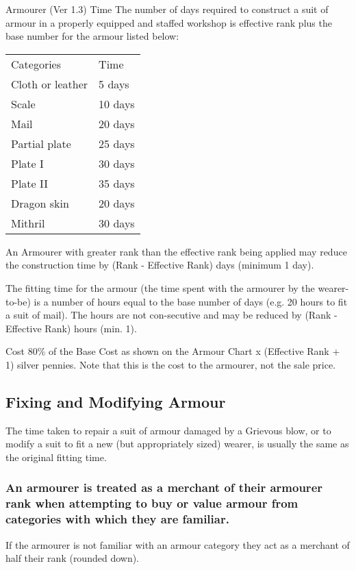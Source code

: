 \begin{Chapter}{Armourer (Ver 1.3)}
Time The number of days required to construct a suit of armour in a
properly equipped and staffed workshop is effective rank plus the base
number for the armour listed below:

\begin{tabularx}{\columnwidth}{ll}
Categories		& Time \\
Cloth or leather	& 5 days \\
Scale			& 10 days \\
Mail			& 20 days \\
Partial plate		& 25 days \\
Plate I			& 30 days \\
Plate II		& 35 days \\
Dragon skin		& 20 days \\
Mithril			& 30 days \\
\end{tabularx}

An Armourer with greater rank than the effective rank being applied
may reduce the construction time by (Rank - Effective Rank) days
(minimum 1 day).

The fitting time for the armour (the time spent with the armourer by
the wearer-to-be) is a number of hours equal to the base number of
days (e.g.  20 hours to fit a suit of mail). The hours are not
con-secutive and may be reduced by (Rank - Effective Rank) hours
(min. 1).

Cost 80\% of the Base Cost as shown on the Armour Chart x (Effective
Rank + 1) silver pennies.  Note that this is the cost to the armourer,
not the sale price.

\subsection{Fixing and Modifying Armour}

The time taken to repair a suit of armour damaged by a Grievous blow,
or to modify a suit to fit a new (but appropriately sized) wearer, is
usually the same as the original fitting time.

\subsubsection{An armourer is treated as a merchant of their armourer rank when
attempting to buy or value armour from categories with which they are
familiar.}

If the armourer is not familiar with an armour category they act as a
merchant of half their rank (rounded down).


\end{Chapter}
